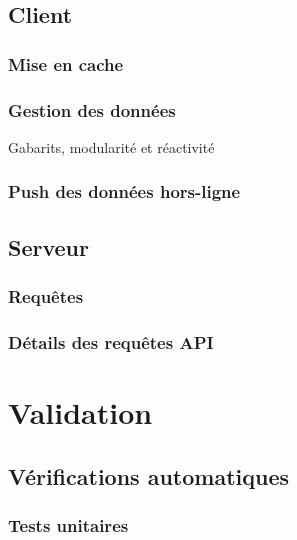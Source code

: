 \documentclass{EPL-master-thesis-covers-FR}
\begin{document}
		\section{Client}


			\subsection*{Mise en cache}
				\label{sec:cache_client}

			
			\subsection*{Gestion des données}
				Gabarits, modularité et réactivité

			\subsection*{Push des données hors-ligne}
				\label{sec:service_worker}
				
				

			

		\section{Serveur}
			\label{sec:serveur}

		

			\subsection*{Requêtes}

			

			\subsection*{Détails des requêtes API}
				\label{sec:api}

			

	\chapter{Validation}


		\section{Vérifications automatiques}

			\subsection*{Tests unitaires}
\end{document}
